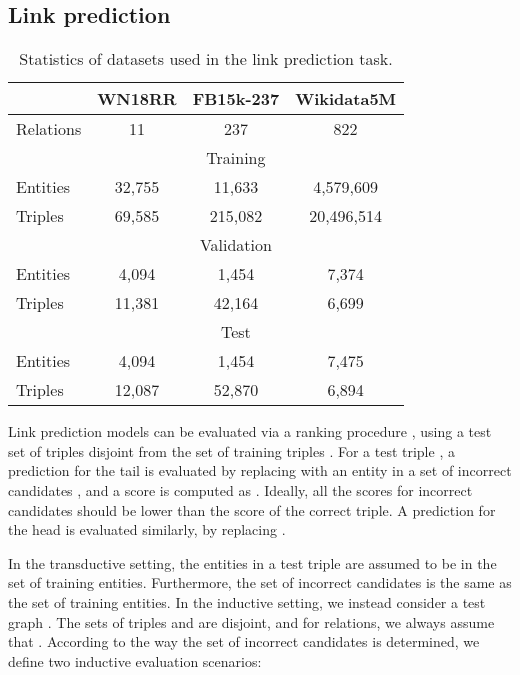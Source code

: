 \documentclass[sigconf]{acmart}
\begin{document}
\subsection{Link prediction}

\begin{table}[t]
\caption{Statistics of datasets used in the link prediction task.}
\label{tab:stats}
\centering
\begin{tabular}{lccc}
\toprule
          & WN18RR & FB15k-237  & Wikidata5M \\
\midrule
Relations & 11     & 237        & 822        \\
\midrule
          &        & Training                \\
                \cmidrule(lr){2-4}                        
Entities  & 32,755 & 11,633     & 4,579,609  \\
Triples   & 69,585 & 215,082    & 20,496,514 \\
\midrule
          &        & Validation              \\
                 \cmidrule(lr){2-4}            
Entities  & 4,094  & 1,454      & 7,374      \\
Triples   & 11,381 & 42,164     & 6,699      \\
\midrule
          &        & Test                    \\
              \cmidrule(lr){2-4}            
Entities  & 4,094  & 1,454      & 7,475      \\
Triples   & 12,087 & 52,870     & 6,894      \\
\bottomrule
\end{tabular}
\end{table}

Link prediction models can be evaluated via a ranking procedure \citep{bordes2011learning}, using a test set of triples  disjoint from the set of training triples . For a test triple , a prediction for the tail is evaluated by replacing  with an entity  in a set of incorrect candidates , and a score is computed as . Ideally, all the scores for incorrect candidates should be lower than the score of the correct triple. A prediction for the head is evaluated similarly, by replacing .

In the transductive setting, the entities in a test triple are assumed to be in the set of training entities. Furthermore, the set of incorrect candidates is the same as the set of training entities. In the inductive setting, we instead consider a test graph . The sets of triples  and  are disjoint, and for relations, we always assume that . According to the way the set of incorrect candidates  is determined, we define two inductive evaluation scenarios:
\end{document}
